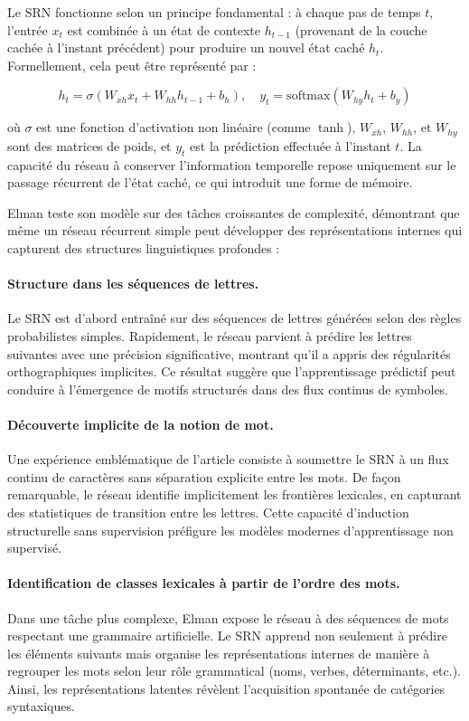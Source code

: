 \documentclass[12pt]{report}
\begin{document}
Le SRN fonctionne selon un principe fondamental : à chaque pas de temps $t$, l’entrée $x_t$ est combinée à un état de contexte $h_{t-1}$ (provenant de la couche cachée à l’instant précédent) pour produire un nouvel état caché $h_t$. Formellement, cela peut être représenté par :

\begin{equation}
h_t = \sigma(W_{xh} x_t + W_{hh} h_{t-1} + b_h), \quad y_t = \text{softmax}(W_{hy} h_t + b_y)
\end{equation}

où $\sigma$ est une fonction d’activation non linéaire (comme $\tanh$), $W_{xh}$, $W_{hh}$, et $W_{hy}$ sont des matrices de poids, et $y_t$ est la prédiction effectuée à l’instant $t$. La capacité du réseau à conserver l’information temporelle repose uniquement sur le passage récurrent de l’état caché, ce qui introduit une forme de mémoire.

Elman teste son modèle sur des tâches croissantes de complexité, démontrant que même un réseau récurrent simple peut développer des représentations internes qui capturent des structures linguistiques profondes :

\paragraph{Structure dans les séquences de lettres.} Le SRN est d’abord entraîné sur des séquences de lettres générées selon des règles probabilistes simples. Rapidement, le réseau parvient à prédire les lettres suivantes avec une précision significative, montrant qu’il a appris des régularités orthographiques implicites. Ce résultat suggère que l’apprentissage prédictif peut conduire à l’émergence de motifs structurés dans des flux continus de symboles.

\paragraph{Découverte implicite de la notion de mot.} Une expérience emblématique de l’article consiste à soumettre le SRN à un flux continu de caractères sans séparation explicite entre les mots. De façon remarquable, le réseau identifie implicitement les frontières lexicales, en capturant des statistiques de transition entre les lettres. Cette capacité d’induction structurelle sans supervision préfigure les modèles modernes d’apprentissage non supervisé.

\paragraph{Identification de classes lexicales à partir de l’ordre des mots.} Dans une tâche plus complexe, Elman expose le réseau à des séquences de mots respectant une grammaire artificielle. Le SRN apprend non seulement à prédire les éléments suivants mais organise les représentations internes de manière à regrouper les mots selon leur rôle grammatical (noms, verbes, déterminants, etc.). Ainsi, les représentations latentes révèlent l’acquisition spontanée de catégories syntaxiques.
\end{document}
